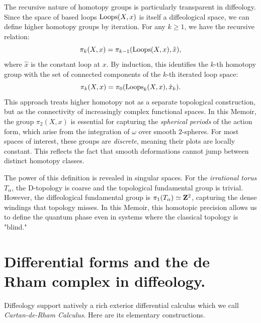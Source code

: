   \begin{article}
    The recursive nature of homotopy groups is particularly transparent in diffeology.
    Since the space of based loops $\operatorname{Loops}(X, x)$ is itself a diffeological space,
    we can define higher homotopy groups by iteration.
    For any $k \geq 1$,
    we have the recursive relation:
    $$
      \pi_k(X, x) = \pi_{k-1}(\operatorname{Loops}(X, x), \hat{x}),
      $$
    where $\hat{x}$ is the constant loop at $x$.
    By induction,
    this identifies the $k$-th homotopy group with the set of connected components of the $k$-th iterated loop space:
    $$
      \pi_k(X, x) = \pi_0(\operatorname{Loops}_k(X,x), \hat{x}_k).
      $$
    This approach treats higher homotopy not as a separate topological construction,
    but as the connectivity of increasingly complex functional spaces.
    In this Memoir,
    the group $\pi_2(X, x)$ is essential for capturing the \emph{spherical periods} of the action form,
    which arise from the integration of $\omega$ over smooth $2$-spheres.
    For most spaces of interest,
    these groups are \emph{discrete},
    meaning their plots are locally constant.
    This reflects the fact that smooth deformations cannot jump between distinct homotopy classes.
    
    The power of this definition is revealed in singular spaces.
    For the \emph{irrational torus} $T_\alpha$,
    the D-topology is coarse and the topological fundamental group is trivial.
    However,
    the diffeological fundamental group is $\pi_1(T_\alpha) \simeq {\mathbf{Z}}^2$,
    capturing the dense windings that topology misses.
    In this Memoir,
    this homotopic precision allows us to define the quantum phase even in systems where the classical topology is "blind."
  \end{article}
  
  \section{Differential forms and the de Rham complex in diffeology.}
  \label{sec:Differential forms and the de Rham complex in diffeology}
  
  Diffeology support natively a rich exterior differential calculus which we call \emph{Cartan-de-Rham Calculus}.
  Here are its elementary constructions.
  
